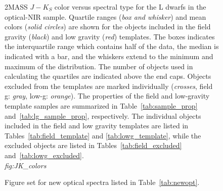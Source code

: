 \documentclass[12pt,preprint]{aastex}
\begin{document}
\begin{figure}
		\caption{2MASS $J-K_S$ color versus spectral type for the L dwarfs in the optical-NIR sample. 
		Quartile ranges (\emph{box and whisker}) and mean colors (\emph{solid circles}) are shown for the objects included in the field gravity (\emph{black}) and low gravity (\emph{red}) templates. The boxes indicates the interquartile range which contains half of the data, the median is indicated with a bar, and the whiskers extend to the minimum and maximum of the distribution. The number of objects used in calculating the quartiles are indicated above the end caps.
		Objects excluded from the templates are marked individually (\emph{crosses}, field g: \emph{gray}, low-g: \emph{orange}).
		The properties of the field and low-gravity template samples are summarized in Table~\ref{tab:sample_prop} and~\ref{tab:lg_sample_prop}, respectively. The individual objects included in the field and low gravity templates are listed in Tables~\ref{tab:field_template} and \ref{tab:lowg_template}, while the excluded objects are listed in Tables~\ref{tab:field_excluded} and~\ref{tab:lowg_excluded}.\\
		\emph{fig:JK\_colors} }
	\label{fig:JK_colors}
\end{figure}

\begin{figure}
		\caption{Figure set for new optical spectra listed in Table~\ref{tab:newopt}.}
	\label{fig:newopt}
\end{figure}
\end{document}
